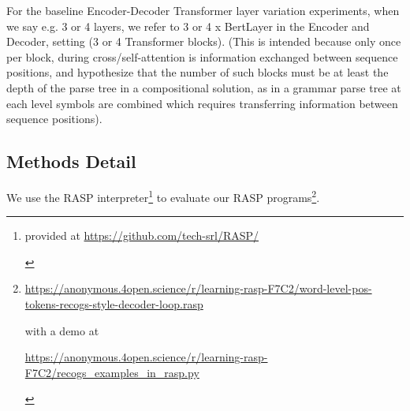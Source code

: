 \documentclass[11pt]{article}
\begin{document}
For the \cite{Wu2023} baseline Encoder-Decoder Transformer layer variation experiments, 
when we say e.g. 3 or 4 layers, we refer to 3 or 4 x BertLayer in the Encoder and Decoder, setting (3 or 4 Transformer blocks).
(This is intended because only once per block, during cross/self-attention is information exchanged between sequence positions, and \cite{Csordas2022} hypothesize that the number of such blocks must be at least the depth of the parse tree in a compositional solution, as in a grammar parse tree at each level symbols are combined which requires transferring information between sequence positions).

\subsection{Methods Detail}
\label{methods_detail}

We use the RASP \cite{Weiss2021} interpreter\footnote{\begin{footnotesize}provided at \href{https://github.com/tech-srl/RASP/}{https://github.com/tech-srl/RASP/}
\end{footnotesize}
} to evaluate our RASP programs\footnote{\begin{footnotesize}\href{https://anonymous.4open.science/r/learning-rasp-F7C2/word-level-pos-tokens-recogs-style-decoder-loop.rasp}{https://anonymous.4open.science/r/learning-rasp-F7C2/word-level-pos-tokens-recogs-style-decoder-loop.rasp}

with a demo at

\href{https://anonymous.4open.science/r/learning-rasp-F7C2/recogs_examples_in_rasp.py}{https://anonymous.4open.science/r/learning-rasp-F7C2/recogs\_examples\_in\_rasp.py}\end{footnotesize}}.
\end{document}

